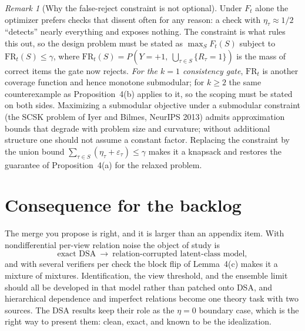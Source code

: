 \documentclass[11pt]{article}
\theoremstyle{remark}
\newtheorem*{remark}{Remark}
\begin{document}
\begin{remark}[Why the false-reject constraint is not optional]
Under $F_t$ alone the optimizer prefers checks that dissent often for any reason: a check with $\eta_\tau\approx1/2$ ``detects'' nearly everything and exposes nothing. The constraint is what rules this out, so the design problem must be stated as
$\max_S F_t(S)$ subject to $\mathrm{FR}_t(S)\le\gamma$, where $\mathrm{FR}_t(S)=P(Y=+1,\ \bigcup_{\tau\in S}\{R_\tau=1\})$ is the mass of correct items the gate now rejects. \emph{For the $k=1$ consistency gate}, $\mathrm{FR}_t$ is another coverage function and hence monotone submodular; for $k\ge2$ the same counterexample as Proposition~4(b) applies to it, so the scoping must be stated on both sides. Maximizing a submodular objective under a submodular constraint (the SCSK problem of Iyer and Bilmes, NeurIPS 2013) admits approximation bounds that degrade with problem size and curvature; without additional structure one should not assume a constant factor. Replacing the constraint by the union bound $\sum_{\tau\in S}(\eta_\tau+\varepsilon_\tau)\le\gamma$ makes it a knapsack and restores the guarantee of Proposition~4(a) for the relaxed problem.
\end{remark}

\section*{Consequence for the backlog}

The merge you propose is right, and it is larger than an appendix item. With nondifferential per-view relation noise the object of study is
\[
\text{exact DSA}\ \longrightarrow\ \text{relation-corrupted latent-class model},
\]
and with several verifiers per check the block flip of Lemma~4(c) makes it a mixture of mixtures. Identification, the view threshold, and the ensemble limit should all be developed in that model rather than patched onto DSA, and hierarchical dependence and imperfect relations become one theory task with two sources. The DSA results keep their role as the $\eta=0$ boundary case, which is the right way to present them: clean, exact, and known to be the idealization.
\end{document}
